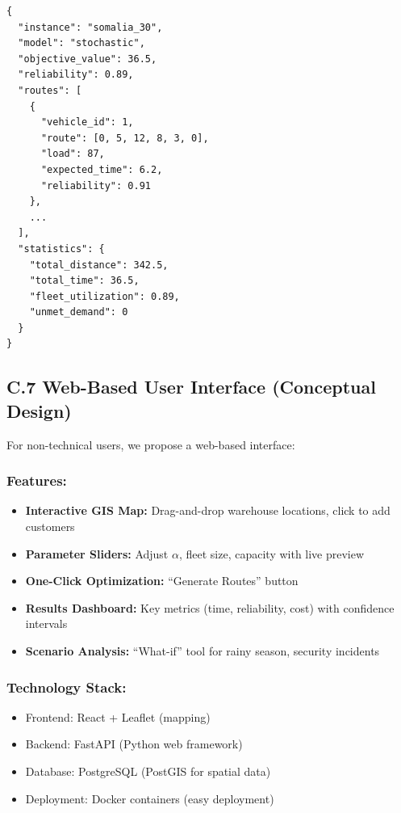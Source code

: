 \begin{verbatim}
{
  "instance": "somalia_30",
  "model": "stochastic",
  "objective_value": 36.5,
  "reliability": 0.89,
  "routes": [
    {
      "vehicle_id": 1,
      "route": [0, 5, 12, 8, 3, 0],
      "load": 87,
      "expected_time": 6.2,
      "reliability": 0.91
    },
    ...
  ],
  "statistics": {
    "total_distance": 342.5,
    "total_time": 36.5,
    "fleet_utilization": 0.89,
    "unmet_demand": 0
  }
}
\end{verbatim}

\subsection{C.7 Web-Based User Interface (Conceptual Design)}

For non-technical users, we propose a web-based interface:

\subsubsection{Features:}
\begin{itemize}
\item \textbf{Interactive GIS Map:} Drag-and-drop warehouse locations, click to add customers
\item \textbf{Parameter Sliders:} Adjust $\alpha$, fleet size, capacity with live preview
\item \textbf{One-Click Optimization:} ``Generate Routes'' button
\item \textbf{Results Dashboard:} Key metrics (time, reliability, cost) with confidence intervals
\item \textbf{Scenario Analysis:} ``What-if'' tool for rainy season, security incidents
\end{itemize}

\subsubsection{Technology Stack:}
\begin{itemize}
\item Frontend: React + Leaflet (mapping)
\item Backend: FastAPI (Python web framework)
\item Database: PostgreSQL (PostGIS for spatial data)
\item Deployment: Docker containers (easy deployment)
\end{itemize}

